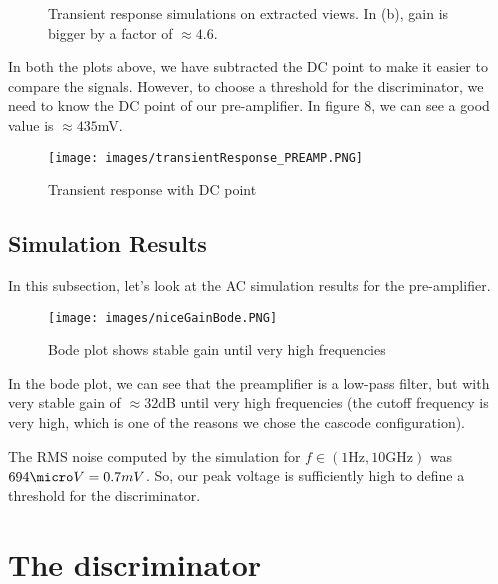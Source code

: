 \documentclass[a4paper,12pt,twoside]{article}
\begin{document}
	\begin{figure}[h!]
		\centering
		\hfill
		\caption{Transient response simulations on extracted views. In (b), gain is bigger by a factor of $\approx 4.6$.}
		\label{simuConfig}
	\end{figure}
	
	In both the plots above, we have subtracted the DC point to make it easier to compare the signals. However, to choose a threshold for the discriminator, we need to know the DC point of our pre-amplifier. In figure 8, we can see a good value is $\approx 435$mV.
	
	\begin{figure}[h!]
		\centering
		\texttt{[image: images/transientResponse\_PREAMP.PNG]}
		\label{fig:transient}
		\caption{Transient response with DC point}
	\end{figure}
	
	\subsection{Simulation Results}
	
	In this subsection, let's look at the AC simulation results for the pre-amplifier.
	
	\begin{figure}[h!]
		\centering
		\texttt{[image: images/niceGainBode.PNG]}
		\label{Bode}
		\caption{Bode plot shows stable gain until very high frequencies}
	\end{figure}
	
	In the bode plot, we can see that the preamplifier is a low-pass filter, but with very stable gain of $\approx 32$dB until very high frequencies (the cutoff frequency is very high, which is one of the reasons we chose the cascode configuration).
	
	The RMS noise computed by the simulation for $f \in (1 \text{Hz}, 10\text{GHz})$ was $694 \micro V = 0.7 mV$. So, our peak voltage is sufficiently high to define a threshold for the discriminator.
	
	\newpage
	
	\section{The discriminator}
	
\end{document}
